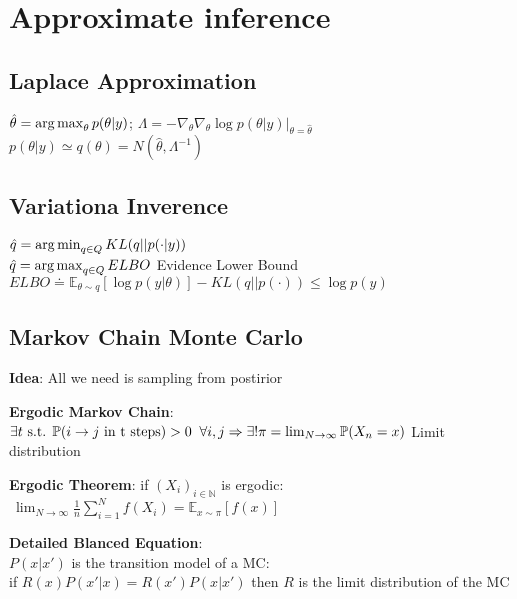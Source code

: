 
\section{Approximate inference}


\subsection{Laplace Approximation}
$\hat\theta=\operatorname*{arg\,max}_\theta p(\theta\vert y)$; 
$\Lambda = -\nabla_\theta \nabla_\theta \log{p(\theta\vert y)}\vert_{\theta = \hat\theta}$\\
$p(\theta\vert y)\simeq q(\theta)=N(\hat\theta,\Lambda^{-1})$


\subsection{Variationa Inverence}
$\hat q = \operatorname*{arg\,min}_{q \in Q} KL(q\vert\vert p(\cdot\vert y))$\\
$\hat q = \operatorname*{arg\,max}_{q \in Q} ELBO$ Evidence Lower Bound\\
$ELBO \doteq \mathbb{E}_{\theta \sim q}\left[\log{p(y\vert\theta)}\right]-KL(q\vert\vert p(\cdot)) \leq \log{p(y)}$


\subsection{Markov Chain Monte Carlo}
\textbf{Idea}: All we need is sampling from postirior

\textbf{Ergodic Markov Chain}: \\
$\exists t \text{ s.t. } \mathbb{P}(i \to j \text{ in t steps})>0\;\; \forall i,j \Rightarrow\\
 \exists! \pi = \lim_{N\to \infty} \mathbb{P}(X_n=x)$ Limit distribution

 \textbf{Ergodic Theorem}: if $(X_i)_{i\in\mathbb{N}}$ is ergodic:\\
$\ \lim_{N\to \infty}\frac{1}{n}\sum_{i=1}^{N}f(X_i)=\mathbb{E}_{x\sim\pi}\left[f(x)\right]$

\textbf{Detailed Blanced Equation}:\\
$P(x\vert x')$ is the transition model of a MC:\\
if $R(x)P(x'\vert x) = R(x')P(x\vert x')$ then $R$ is the limit distribution of the MC

